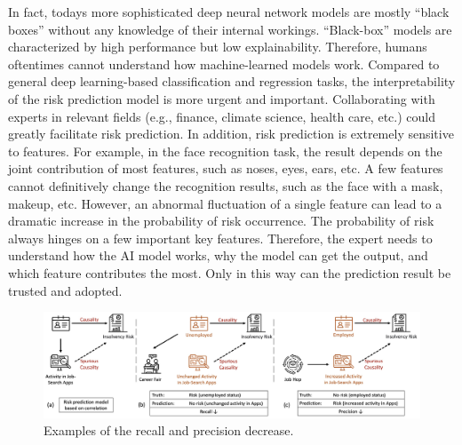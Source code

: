 \documentclass[letterpaper]{article} %
\theoremstyle{definition}
\theoremstyle{remark}
\begin{document}
In fact, todays more sophisticated deep neural network models are mostly ``black boxes'' without any knowledge of their internal workings. ``Black-box'' models are characterized by high performance but low explainability. Therefore, humans oftentimes cannot understand how machine-learned models work. Compared to general deep learning-based classification and regression tasks, the interpretability of the risk prediction model is more urgent and important. Collaborating with experts in relevant fields (e.g., finance, climate science, health care, etc.) could greatly facilitate risk prediction. In addition, risk prediction is extremely sensitive to features. For example, in the face recognition task, the result depends on the joint contribution of most features, such as noses, eyes, ears, etc. A few features cannot definitively change the recognition results, such as the face with a mask, makeup, etc. However, an abnormal fluctuation of a single feature can lead to a dramatic increase in the probability of risk occurrence. The probability of risk always hinges on a few important key features. Therefore, the expert needs to understand how the AI model works, why the model can get the output, and which feature contributes the most. Only in this way can the prediction result be trusted and adopted.
\begin{figure}
  \centering
  \includegraphics[width=0.95\linewidth]{causal_correlation.jpg}

  \caption{Examples of the recall and precision decrease.}

  \label{fig:correlation}
\end{figure}
\end{document}
